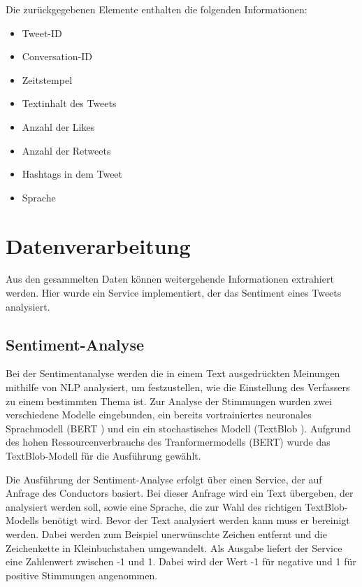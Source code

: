 \documentclass[conference]{IEEEtran}
\begin{document}
Die zurückgegebenen Elemente enthalten die folgenden Informationen:
\begin{itemize}
    \item Tweet-ID
    \item Conversation-ID
    \item Zeitstempel
    \item Textinhalt des Tweets
    \item Anzahl der Likes
    \item Anzahl der Retweets
    \item Hashtags in dem Tweet
    \item Sprache
\end{itemize}

\section{Datenverarbeitung}
Aus den gesammelten Daten können weitergehende Informationen extrahiert werden.
Hier wurde ein Service implementiert, der das Sentiment eines Tweets analysiert.

\subsection*{Sentiment-Analyse}
Bei der Sentimentanalyse werden die in einem Text ausgedrückten Meinungen mithilfe von NLP analysiert,
um festzustellen, wie die Einstellung des Verfassers zu einem bestimmten Thema ist.
Zur Analyse der Stimmungen wurden zwei verschiedene Modelle eingebunden,
ein bereits vortrainiertes neuronales Sprachmodell (BERT \cite{bert})
und ein ein stochastisches Modell (TextBlob \cite{textblob}).
Aufgrund des hohen Ressourcenverbrauchs des Tranformermodells (BERT) wurde das TextBlob-Modell für die Ausführung gewählt.

Die Ausführung der Sentiment-Analyse erfolgt über einen Service, der auf Anfrage des Conductors basiert.
Bei dieser Anfrage wird ein Text übergeben, der analysiert werden soll,
sowie eine Sprache, die zur Wahl des richtigen TextBlob-Modells benötigt wird.
Bevor der Text analysiert werden kann muss er bereinigt werden.
Dabei werden zum Beispiel unerwünschte Zeichen entfernt und die Zeichenkette in Kleinbuchstaben umgewandelt.
Als Ausgabe liefert der Service eine Zahlenwert zwischen -1 und 1.
Dabei wird der Wert -1 für negative und 1 für positive Stimmungen angenommen.
\end{document}
